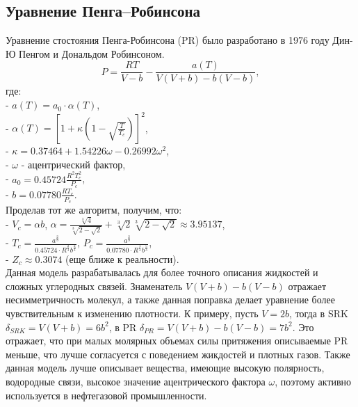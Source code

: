 \documentclass[a4paper]{article}
\numberwithin{equation}{subsection} %
\begin{document}
\subsection{Уравнение Пенга–Робинсона} 
Уравнение стостояния Пенга-Робинсона (PR) было разработано в 1976 году Дин-Ю Пенгом и Дональдом Робинсоном.
\begin{equation}
      P = \frac{RT}{V-b} - \frac{a(T)}{V(V+b) - b(V-b)},
\tag{\thesubsection}
\end{equation}
где:\\
- $a(T) = a_0 \cdot \alpha(T)$,\\
- $\alpha(T) = \left[ 1 + \kappa(1-\sqrt{\frac{T}{T_c}})\right]^2$,\\
- $\kappa = 0.37464 + 1.54226\omega - 0.26992\omega^2$,\\
- $\omega$ - ацентрический фактор,\\
- $a_0 = 0.45724\frac{R^2T_c^{2}}{P_c}$,\\
- $b = 0.07780\frac{RT_c}{P_c}$.\\
Проделав тот же алгоритм, получим, что:\\
- $V_c = \alpha b$, $\alpha = \frac{\sqrt[3]{4}}{\sqrt[3]{2-\sqrt{2}}} + \sqrt[3]{2}\sqrt[3]{2-\sqrt{2}} \approx 3.95137$,\\
- $T_c = \frac{a^{\frac{2}{3}}}{0.45724 \cdot R^{\frac{2}{3}}b^{\frac{2}{3}}}$, $P_c = \frac{a^{\frac{2}{3}}}{0.07780 \cdot R^{\frac{1}{3}}b^{\frac{5}{3}}}$,\\
- $Z_c \approx 0.3074$ (еще ближе к реальности).\\
Данная модель разрабатывалась для более точного описания жидкостей и сложных углеродных связей. Знаменатель $V(V+b) - b(V-b)$ отражает несимметричность молекул, а также данная поправка делает уравнение более чувствительным к изменению плотности. К примеру, пусть $V = 2b$, тогда в SRK $\delta_{SRK} = V(V+b) = 6b^2$, в PR $\delta_{PR} = V(V+b) - b(V-b) = 7b^2$. Это отражает, что при малых молярных объемах силы притяжения описываемые PR меньше, что лучше согласуется с поведением жикдостей и плотных газов. Также данная модель лучше описывает вещества, имеющие высокую полярность, водородные связи, высокое значение ацентрического фактора $\omega$, поэтому активно используется в нефтегазовой промышленности. 
\end{document}
